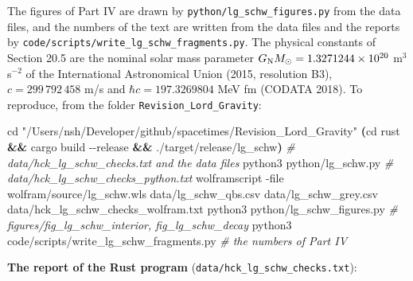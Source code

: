 \documentclass[
  10pt,
]{article}
\newenvironment{Shaded}{}{}
\newcommand{\AttributeTok}[1]{\textcolor[rgb]{0.49,0.56,0.16}{#1}}
\newcommand{\BuiltInTok}[1]{\textcolor[rgb]{0.00,0.50,0.00}{#1}}
\newcommand{\CommentTok}[1]{\textcolor[rgb]{0.38,0.63,0.69}{\textit{#1}}}
\newcommand{\ExtensionTok}[1]{#1}
\newcommand{\KeywordTok}[1]{\textcolor[rgb]{0.00,0.44,0.13}{\textbf{#1}}}
\newcommand{\NormalTok}[1]{#1}
\newcommand{\StringTok}[1]{\textcolor[rgb]{0.25,0.44,0.63}{#1}}
\begin{document}
The figures of Part IV are drawn by \texttt{python/lg\_schw\_figures.py}
from the data files, and the numbers of the text are written from the
data files and the reports by
\texttt{code/scripts/write\_lg\_schw\_fragments.py}. The physical
constants of Section 20.5 are the nominal solar mass parameter
\(G_{\rm N}M_\odot=1.3271244\times10^{20}\) m\(^3\) s\(^{-2}\) of the
International Astronomical Union (2015, resolution B3),
\(c=299\,792\,458\) m/s and \(\hbar c=197.3269804\) MeV fm (CODATA
2018). To reproduce, from the folder \texttt{Revision\_Lord\_Gravity}:

\begin{Shaded}
\begin{Highlighting}[]
\BuiltInTok{cd} \StringTok{"/Users/nsh/Developer/github/spacetimes/Revision\_Lord\_Gravity"}
\KeywordTok{(}\BuiltInTok{cd}\NormalTok{ rust }\KeywordTok{\&\&} \ExtensionTok{cargo}\NormalTok{ build }\AttributeTok{{-}{-}release} \KeywordTok{\&\&} \ExtensionTok{./target/release/lg\_schw}\KeywordTok{)}   \CommentTok{\# data/hck\_lg\_schw\_checks.txt and the data files}
\ExtensionTok{python3}\NormalTok{ python/lg\_schw.py                                         }\CommentTok{\# data/hck\_lg\_schw\_checks\_python.txt}
\ExtensionTok{wolframscript} \AttributeTok{{-}file}\NormalTok{ wolfram/source/lg\_schw.wls data/lg\_schw\_qbs.csv data/lg\_schw\_grey.csv data/hck\_lg\_schw\_checks\_wolfram.txt}
\ExtensionTok{python3}\NormalTok{ python/lg\_schw\_figures.py                                 }\CommentTok{\# figures/fig\_lg\_schw\_interior, fig\_lg\_schw\_decay}
\ExtensionTok{python3}\NormalTok{ code/scripts/write\_lg\_schw\_fragments.py                  }\CommentTok{\# the numbers of Part IV}
\end{Highlighting}
\end{Shaded}

\textbf{The report of the Rust program}
(\texttt{data/hck\_lg\_schw\_checks.txt}):
\end{document}
